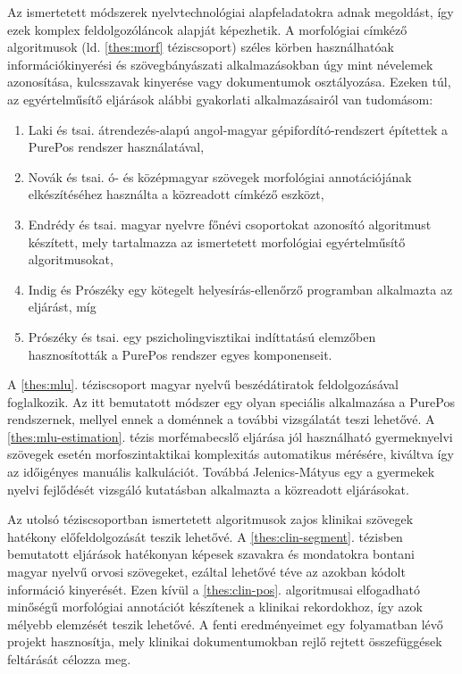 Az ismertetett módszerek nyelvtechnológiai alapfeladatokra adnak megoldást, így ezek komplex feldolgozóláncok alapját képezhetik.
A morfológiai címkéző algoritmusok (ld. \ref{thes:morf} téziscsoport) széles körben használhatóak információkinyerési és szövegbányászati alkalmazásokban úgy mint névelemek azonosítása, kulcsszavak kinyerése vagy dokumentumok osztályozása.
Ezeken túl, az egyértelműsítő eljárások alábbi gyakorlati alkalmazásairól van tudomásom:
\begin{enumerate} %
\item Laki és tsai. átrendezés-alapú angol-magyar gépifordító-rendszert \cite{Laki2013} építettek a PurePos rendszer használatával,
\item Novák és tsai. ó- és középmagyar szövegek morfológiai annotációjának elkészítéséhez használta \cite{Novak2013} a közreadott címkéző eszközt,
\item Endrédy és tsai. \cite{Endredy2014} magyar nyelvre főnévi csoportokat azonosító algoritmust készített, mely tartalmazza az ismertetett morfológiai egyértelműsítő algoritmusokat,
\item Indig és Prószéky \cite{Indig2013} egy kötegelt helyesírás-ellenőrző programban alkalmazta az eljárást, míg
\item Prószéky és tsai. egy pszicholingvisztikai indíttatású elemzőben hasznosították \cite{Proszeky2014} a PurePos rendszer egyes komponenseit.
\end{enumerate}

A \ref{thes:mlu}. téziscsoport magyar nyelvű beszédátiratok feldolgozásával foglalkozik. 
Az itt bemutatott módszer egy olyan speciális alkalmazása a PurePos rendszernek, mellyel ennek a doménnek a további vizsgálatát teszi lehetővé.
A \ref{thes:mlu-estimation}. tézis morfémabecslő eljárása jól használható gyermeknyelvi szövegek esetén morfoszintaktikai komplexitás automatikus mérésére, kiváltva így az időigényes manuális kalkulációt.
Továbbá Jelenics-Mátyus \cite{Matyus2014b} egy a gyermekek nyelvi fejlődését vizsgáló kutatásban alkalmazta a közreadott eljárásokat. 

Az utolsó téziscsoportban ismertetett algoritmusok zajos klinikai szövegek hatékony előfeldolgozását teszik lehetővé.
A \ref{thes:clin-segment}. tézisben bemutatott eljárások hatékonyan képesek szavakra és mondatokra bontani magyar nyelvű orvosi szövegeket, ezáltal lehetővé téve az azokban kódolt információ kinyerését. 
Ezen kívül a \ref{thes:clin-pos}. algoritmusai elfogadható minőségű morfológiai annotációt készítenek a klinikai rekordokhoz, így azok mélyebb elemzését teszik lehetővé.
A fenti eredményeimet egy folyamatban lévő projekt \cite{Siklosi2014,Siklosi2014mszny} hasznosítja, mely klinikai dokumentumokban rejlő rejtett összefüggések feltárását célozza  meg.


